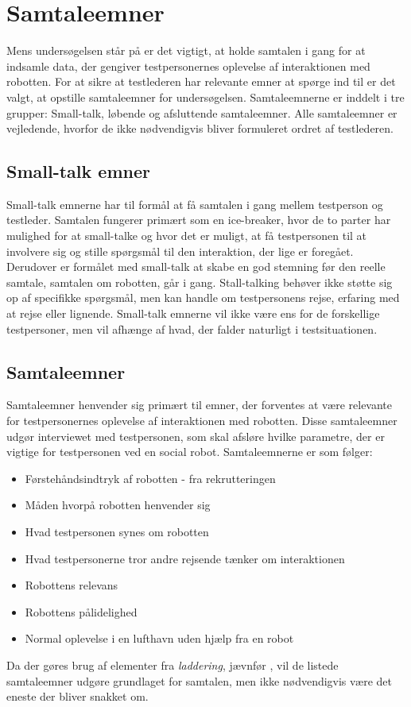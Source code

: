 \section{Samtaleemner}
\label{ParametreSamtaleemner}
%
Mens undersøgelsen står på er det vigtigt, at holde samtalen i gang for at indsamle data, der gengiver testpersonernes oplevelse af interaktionen med robotten. For at sikre at testlederen har relevante emner at spørge ind til er det valgt, at opstille samtaleemner for undersøgelsen. Samtaleemnerne er inddelt i tre grupper: Small-talk, løbende og afsluttende samtaleemner. Alle samtaleemner er vejledende, hvorfor de ikke nødvendigvis bliver formuleret ordret af testlederen.

\subsection{Small-talk emner} 
\label{ParametreISmallTalk}
%
Small-talk emnerne har til formål at få samtalen i gang mellem testperson og testleder. Samtalen fungerer primært som en ice-breaker, hvor de to parter har mulighed for at small-talke og hvor det er muligt, at få testpersonen til at involvere sig og stille spørgsmål til den interaktion, der lige er foregået. Derudover er formålet med small-talk at skabe en god stemning før den reelle samtale, samtalen om robotten, går i gang. Stall-talking behøver ikke støtte sig op af specifikke spørgsmål, men kan handle om testpersonens rejse, erfaring med at rejse eller lignende. Small-talk emnerne vil ikke være ens for de forskellige testpersoner, men vil afhænge af hvad, der falder naturligt i testsituationen.  
%
\subsection{Samtaleemner} 
\label{ParametreSamtaleemner}
%
Samtaleemner henvender sig primært til emner, der forventes at være relevante for testpersonernes oplevelse af interaktionen med robotten. Disse samtaleemner udgør interviewet med testpersonen, som skal afsløre hvilke parametre, der er vigtige for testpersonen ved en social robot. Samtaleemnerne er som følger:\blankline
%
\begin{itemize}
\item Førstehåndsindtryk af robotten - fra rekrutteringen
\item Måden hvorpå robotten henvender sig
\item Hvad testpersonen synes om robotten
\item Hvad testpersonerne tror andre rejsende tænker om interaktionen 
\item Robottens relevans
\item Robottens pålidelighed
\item Normal oplevelse i en lufthavn uden hjælp fra en robot\blankline 
\end{itemize}
\noindent
%
Da der gøres brug af elementer fra \textit{laddering}, jævnfør , vil de listede samtaleemner udgøre grundlaget for samtalen, men ikke nødvendigvis være det eneste der bliver snakket om. 
%

